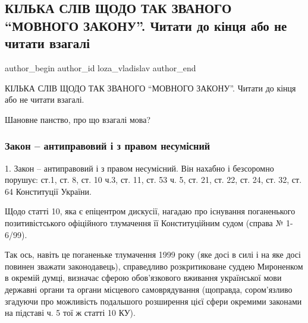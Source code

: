  
 
 
 
 
 
\subsection{КІЛЬКА СЛІВ ЩОДО ТАК ЗВАНОГО \enquote{МОВНОГО ЗАКОНУ}. Читати до кінця або не читати взагалі}
\label{sec:23_01_2021.fb.loza_vladislav.1.movnyj_zakon}
\ifcmt
 author_begin
   author_id loza_vladislav
 author_end
\fi

КІЛЬКА СЛІВ ЩОДО ТАК ЗВАНОГО \enquote{МОВНОГО ЗАКОНУ}. Читати до кінця або не читати взагалі.

Шановне панство, про що взагалі мова?

\subsubsection{Закон – антиправовий і з правом несумісний}

1. Закон – антиправовий і з правом несумісний. Він нахабно і безсоромно порушує:
ст.1, ст. 8, ст. 10 ч.3, ст. 11, ст. 53 ч. 5, ст. 21, ст. 22, ст. 24, ст. 32,
ст. 64 Конституції України. 

Щодо статті 10, яка є епіцентром дискусії, нагадаю
про існування поганенького позитивістського офіційного тлумачення її
Конституційним судом (справа № 1-6/99). 

Так ось, навіть це поганеньке
тлумачення 1999 року (яке досі в силі і на яке досі повинен зважати
законодавець), справедливо розкритиковане суддею Мироненком в окремій думці,
визначає сферою обов'язкового вживання української мови державні органи та
органи місцевого самоврядування (щоправда, сором'язливо згадуючи про можливість
подальшого розширення цієї сфери окремими законами на підставі ч. 5 тої ж
статті 10 КУ). 

